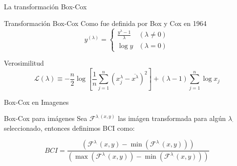 \documentclass{beamer}
\begin{document}
\begin{frame}{La transformación Box-Cox}
     
    \begin{block}{Transformación Box-Cox}
    Como fue definida por Box y Cox en 1964 \cite{boxcox}
        \begin{equation}
            y^{(\lambda)}= \begin{cases}\frac{y^{\lambda}-1}{\lambda} & (\lambda \neq 0) \\ \log y & (\lambda=0)\end{cases}
        \end{equation}
    \end{block}
         
    \begin{block}{Verosimilitud}
        \begin{equation*}
            \mathcal{L}(\lambda) \equiv-\frac{n}{2} \log \left[\frac{1}{n} \sum_{j=1}^{n}\left(x_{j}^{\lambda}-\overline{x^{\lambda}}\right)^{2}\right] +(\lambda-1) \sum_{j=1}^{n} \log x_{j}
        \end{equation*}
    \end{block}
    
\end{frame}

\begin{frame}{Box-Cox en Imagenes}

    \begin{block}{Box-Cox para im\'agenes}
        Sea $\mathcal{F}^{\lambda_{\cdot}(x, y)}$ las im\'agen transformada para alg\'un $\lambda_\cdot$ seleccionado, entonces definimos BCI como:

    \begin{equation}
        BCI = \frac{\left(\mathcal{F}^{\lambda_{\cdot}}(x, y) - \min\left(\mathcal{F}^{\lambda_{\cdot}}(x, y)\right)\right)}{\left(\max\left(\mathcal{F}^{\lambda_{\cdot}}(x, y)\right) - \min\left(\mathcal{F}^{\lambda_{\cdot}}(x, y)\right)\right)}
    \end{equation}
    \end{block}
\end{frame}
\end{document}
